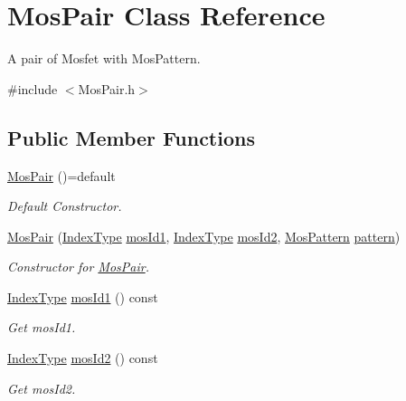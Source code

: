 \hypertarget{classMosPair}{}\section{Mos\+Pair Class Reference}
\label{classMosPair}


A pair of Mosfet with Mos\+Pattern.  




{\ttfamily \#include $<$Mos\+Pair.\+h$>$}

\subsection*{Public Member Functions}
\begin{DoxyCompactItemize}
\item 
\hyperlink{classMosPair_ad595508e33836b1645f98d85978375c1}{Mos\+Pair} ()=default
\begin{DoxyCompactList}\small\item\em Default Constructor. \end{DoxyCompactList}\item 
\hyperlink{classMosPair_a03e4f764099652cbb0a79f7e0392c315}{Mos\+Pair} (\hyperlink{type_8h_a581e8093e28e7362f2b6937296190676}{Index\+Type} \hyperlink{classMosPair_a324d89c99656159e6882e6f9701f0efe}{mos\+Id1}, \hyperlink{type_8h_a581e8093e28e7362f2b6937296190676}{Index\+Type} \hyperlink{classMosPair_a08f2d371ecad665d546bef76c45e2665}{mos\+Id2}, \hyperlink{type_8h_af19eddb079bfea723256710b029c38e8}{Mos\+Pattern} \hyperlink{classMosPair_a342efc591b339fc9d08ad468d7399dd9}{pattern})
\begin{DoxyCompactList}\small\item\em Constructor for \hyperlink{classMosPair}{Mos\+Pair}. \end{DoxyCompactList}\item 
\hyperlink{type_8h_a581e8093e28e7362f2b6937296190676}{Index\+Type} \hyperlink{classMosPair_a324d89c99656159e6882e6f9701f0efe}{mos\+Id1} () const
\begin{DoxyCompactList}\small\item\em Get mos\+Id1. \end{DoxyCompactList}\item 
\hyperlink{type_8h_a581e8093e28e7362f2b6937296190676}{Index\+Type} \hyperlink{classMosPair_a08f2d371ecad665d546bef76c45e2665}{mos\+Id2} () const
\begin{DoxyCompactList}\small\item\em Get mos\+Id2. \end{DoxyCompactList}\item 

\end{DoxyCompactItemize}

